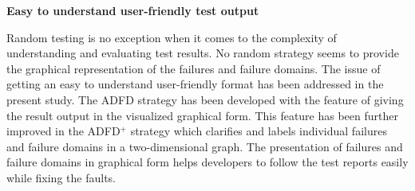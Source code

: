 \textbf{Easy to understand user-friendly test output}

Random testing is no exception when it comes to the complexity of understanding and evaluating test results. No random strategy seems to provide the graphical representation of the failures and failure domains. The issue of getting an easy to understand user-friendly format has been addressed in the present study. The ADFD strategy has been developed with the feature of giving the result output in the visualized graphical form. This feature has been further improved in the ADFD$^+$ strategy which clarifies and labels individual failures and failure domains in a two-dimensional graph. The presentation of failures and failure domains in graphical form helps developers to follow the test reports easily while fixing the faults.  \\




